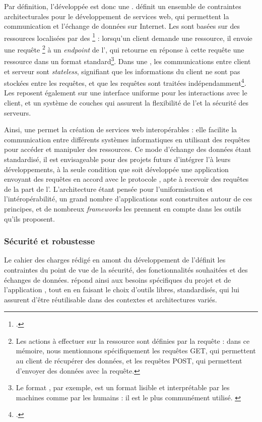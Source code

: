     Par définition, l'\api développée est donc une \api \rest. \rest définit un ensemble de contraintes architecturales pour le développement de services web, qui permettent la communication et l'échange de données sur Internet. Les \api \rest sont basées sur des ressources localisées par des \URL\footcite{APIRESTEst} : lorsqu'un client demande une ressource, il envoie une requête \http\footnote{Les actions à effectuer sur la ressource sont définies par la requête \http : dans ce mémoire, nous mentionnons spécifiquement les requêtes GET, qui permettent au client de récupérer des données, et les requêtes POST, qui permettent d'envoyer des données avec la requête.} à un \textit{endpoint} de l'\api, qui retourne en réponse à cette requête une ressource dans un format standard\footnote{Le format \json, par exemple, est un format lisible et interprétable par les machines comme par les humains : il est le plus communément utilisé. \cite{APIRESTEst}}. Dans une \api \rest, les communications entre client et serveur sont \textit{stateless}, signifiant que les informations du client ne sont pas stockées entre les requêtes, et que les requêtes sont traitées indépendamment\footcite{APIRESTEst}. Les \api \rest reposent également sur une interface uniforme pour les interactions avec le client, et un système de couches qui assurent la flexibilité de l'\api et la sécurité des serveurs.
    
    Ainsi, une \api \rest permet la création de services web interopérables : elle facilite la communication entre différents systèmes informatiques en utilisant des requêtes \http pour accéder et manipuler des ressources. Ce mode d'échange des données étant standardisé, il est envisageable pour des projets futurs d'intégrer l'\api à leurs développements, à la seule condition que soit développée une application envoyant des requêtes en accord avec le protocole \http, apte à recevoir des requêtes de la part de l'\api. L'architecture \rest étant pensée pour l'uniformisation et l'intéropérabilité, un grand nombre d'applications sont construites autour de ces principes, et de nombreux \textit{frameworks} les prennent en compte dans les outils qu'ils proposent.
        
    \subsubsection{Sécurité et robustesse}
    Le cahier des charges rédigé en amont du développement de l'\api définit les contraintes du point de vue de la sécurité, des fonctionnalités souhaitées et des échanges de données. \exapi répond ainsi aux besoins spécifiques du projet et de l'application \eida, tout en en faisant le choix d'outils libres, standardisés, qui lui assurent d'être réutilisable dans des contextes et architectures variés.
    

